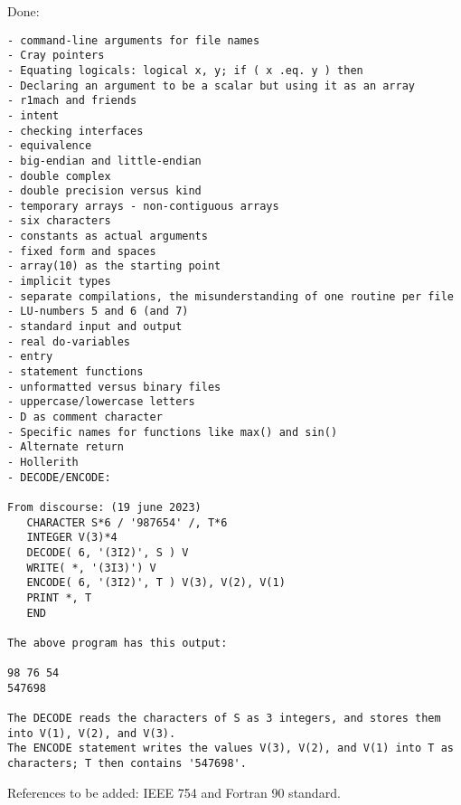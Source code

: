 \documentclass{article}
\begin{document}
Done:
\begin{verbatim}
- command-line arguments for file names
- Cray pointers
- Equating logicals: logical x, y; if ( x .eq. y ) then
- Declaring an argument to be a scalar but using it as an array
- r1mach and friends
- intent
- checking interfaces
- equivalence
- big-endian and little-endian
- double complex
- double precision versus kind
- temporary arrays - non-contiguous arrays
- six characters
- constants as actual arguments
- fixed form and spaces
- array(10) as the starting point
- implicit types
- separate compilations, the misunderstanding of one routine per file
- LU-numbers 5 and 6 (and 7)
- standard input and output
- real do-variables
- entry
- statement functions
- unformatted versus binary files
- uppercase/lowercase letters
- D as comment character
- Specific names for functions like max() and sin()
- Alternate return
- Hollerith
- DECODE/ENCODE:

From discourse: (19 june 2023)
   CHARACTER S*6 / '987654' /, T*6
   INTEGER V(3)*4
   DECODE( 6, '(3I2)', S ) V
   WRITE( *, '(3I3)') V
   ENCODE( 6, '(3I2)', T ) V(3), V(2), V(1)
   PRINT *, T
   END

The above program has this output:

98 76 54
547698

The DECODE reads the characters of S as 3 integers, and stores them into V(1), V(2), and V(3).
The ENCODE statement writes the values V(3), V(2), and V(1) into T as characters; T then contains '547698'.

\end{verbatim}


References to be added: IEEE 754 and Fortran 90 standard.



\end{document}
